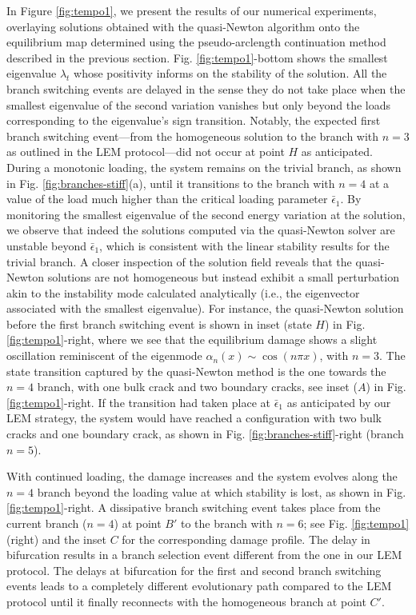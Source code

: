 \documentclass[10pt]{article}
\begin{document}
In Figure \ref{fig:tempo1}, we present the results of our numerical experiments, overlaying solutions obtained with the quasi-Newton algorithm onto the equilibrium map determined using the pseudo-arclength continuation method described in the previous section. Fig. \ref{fig:tempo1}-bottom shows the smallest eigenvalue $\lambda_t$ whose positivity informs on the stability of the solution. All the branch switching events are delayed in the sense they do not take place when the smallest eigenvalue of the second variation vanishes but only beyond the loads corresponding to the eigenvalue's sign transition. Notably, the expected first branch switching event—from the {homogeneous} solution to the branch with \(n=3\) as outlined in the LEM protocol—did not occur at point $H$ as anticipated. During a monotonic loading, the system remains on the trivial branch, as shown in Fig. \ref{fig:branches-stiff}(a), until it transitions to the branch with \(n=4\) at a value of the load much higher than the critical loading parameter \(\bar{\epsilon}_1\). By monitoring the smallest eigenvalue of the second energy variation at the solution, we observe that indeed the solutions computed via the quasi-Newton solver are unstable beyond \(\bar{\epsilon}_1\), which is consistent with the linear stability results for the trivial branch. A closer inspection of the solution field reveals that the quasi-Newton solutions are not homogeneous but instead exhibit a small perturbation akin to the instability mode calculated analytically (i.e., the eigenvector associated with the smallest eigenvalue). For instance, the  quasi-Newton solution before the first branch switching event is shown in inset (state $H$) in Fig. \ref{fig:tempo1}-right, where we see that the equilibrium damage shows a slight oscillation reminiscent of the eigenmode \(\alpha_n(x) \sim \cos(n\pi x)\), with \(n=3\). The state transition captured by the quasi-Newton method is the one towards the \(n=4\) branch, with one bulk crack and two boundary cracks, see inset ($A$) in Fig. \ref{fig:tempo1}-right. If the transition had taken place at \(\bar{\epsilon}_1\) as anticipated by our LEM strategy, the system would have reached a configuration with two bulk cracks and one boundary crack, as shown in Fig. \ref{fig:branches-stiff}-right (branch $n=5$).

With continued loading, the damage increases and the system evolves along the \(n=4\) branch beyond the loading value at which stability is lost, as shown in Fig. \ref{fig:tempo1}-right. A dissipative branch switching event takes place from the current branch (\(n=4\)) at point \(B'\) to the branch with \(n=6\); see Fig. \ref{fig:tempo1}(right) and the inset $C$ for the corresponding damage profile. The delay in bifurcation results in a branch selection event different from the one in our LEM protocol. The delays at bifurcation for the first and second branch switching events leads to a completely different evolutionary path compared to the LEM protocol until it finally reconnects with the homogeneous branch at point \(C'\).
\end{document}
